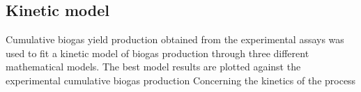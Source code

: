 \subsection{Kinetic model}
Cumulative biogas yield production obtained from the experimental assays was used to fit a kinetic model of biogas production through three different mathematical models. The best model results are plotted against the experimental cumulative biogas production
Concerning the kinetics of the process